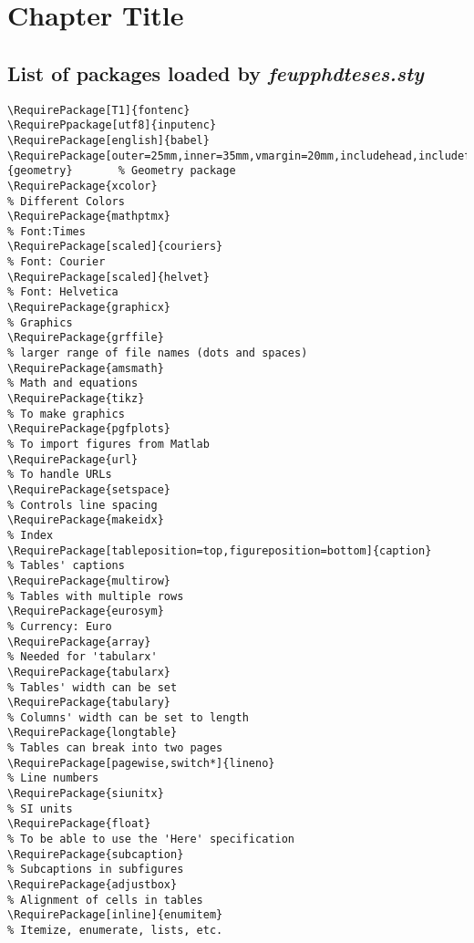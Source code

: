 \chapter{Chapter Title}
\label{chap:Chapter2}

\section{List of packages loaded by \emph{feupphdteses.sty}}

{\tiny
\begin{verbatim}
\RequirePackage[T1]{fontenc}
\RequirePpackage[utf8]{inputenc}
\RequirePackage[english]{babel}
\RequirePackage[outer=25mm,inner=35mm,vmargin=20mm,includehead,includefoot,headheight=15pt]{geometry}		% Geometry package
\RequirePackage{xcolor}																											% Different Colors
\RequirePackage{mathptmx}																										% Font:Times
\RequirePackage[scaled]{couriers}  																					% Font: Courier
\RequirePackage[scaled]{helvet}    																					% Font: Helvetica
\RequirePackage{graphicx}																										% Graphics
\RequirePackage{grffile}																										% larger range of file names (dots and spaces)
\RequirePackage{amsmath}																										% Math and equations
\RequirePackage{tikz}																												% To make graphics
\RequirePackage{pgfplots}																										% To import figures from Matlab
\RequirePackage{url}																												% To handle URLs
\RequirePackage{setspace}																										% Controls line spacing
\RequirePackage{makeidx}																										% Index
\RequirePackage[tableposition=top,figureposition=bottom]{caption}						% Tables' captions
\RequirePackage{multirow}																										% Tables with multiple rows
\RequirePackage{eurosym}																										% Currency: Euro
\RequirePackage{array}																											% Needed for 'tabularx'
\RequirePackage{tabularx}																										% Tables' width can be set
\RequirePackage{tabulary}																										% Columns' width can be set to length
\RequirePackage{longtable}																									% Tables can break into two pages
\RequirePackage[pagewise,switch*]{lineno}																		% Line numbers
\RequirePackage{siunitx}																										% SI units
\RequirePackage{float}																											% To be able to use the 'Here' specification
\RequirePackage{subcaption}																									% Subcaptions in subfigures
\RequirePackage{adjustbox}																									% Alignment of cells in tables
\RequirePackage[inline]{enumitem}																						% Itemize, enumerate, lists, etc.

\end{verbatim}}
